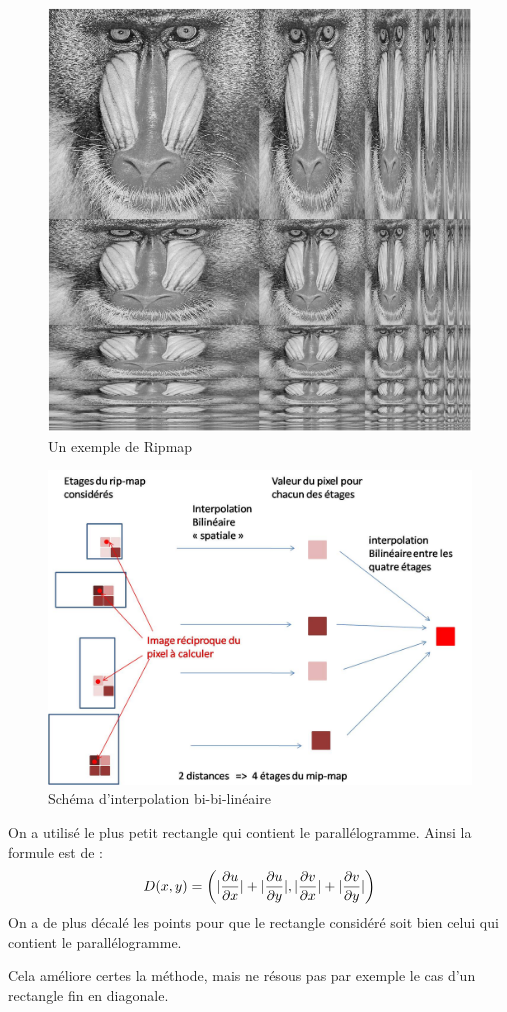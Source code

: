 \begin{figure}[h!]
\centering
\caption{Un exemple de Ripmap}
\includegraphics[scale=0.4]{Ripmap_real}
\end{figure}


\begin{figure}[h!]
\centering
\caption{Schéma d'interpolation bi-bi-linéaire}
\includegraphics[scale=0.5]{interbibilineaire.jpg}
\end{figure}


On a utilisé le plus petit rectangle qui contient le parallélogramme. Ainsi la formule est de :
$$D(x,y) = \left( |\frac{\partial u}{\partial x}|+|\frac{\partial u}{\partial y}|,|\frac{\partial v}{\partial x}|+|\frac{\partial v}{\partial y}|\right)$$
On a de plus décalé les points pour que le rectangle considéré soit bien celui qui contient le parallélogramme.

Cela améliore certes la méthode, mais ne résous pas par exemple le cas d'un rectangle fin en diagonale.


